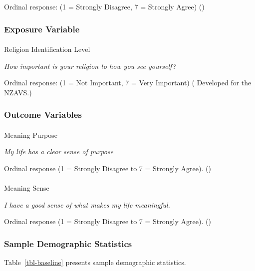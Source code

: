 \documentclass[
  single column]{article}
\makeatletter
\let\oldparagraph\paragraph
\renewcommand{\paragraph}{
    \@ifstar
      \xxxParagraphStar
      \xxxParagraphNoStar
  }
\newcommand{\xxxParagraphStar}[1]{\oldparagraph*{#1}\mbox{}}
\newcommand{\xxxParagraphNoStar}[1]{\oldparagraph{#1}\mbox{}}
\makeatother
\begin{document}
Ordinal response: (1 = Strongly Disagree, 7 = Strongly Agree)
()

\subsubsection{Exposure Variable}\label{exposure-variable}

\paragraph{Religion Identification
Level}\label{religion-identification-level}

\emph{How important is your religion to how you see yourself?}

Ordinal response: (1 = Not Important, 7 = Very Important)
( Developed for the
NZAVS.)

\subsubsection{Outcome Variables}\label{outcome-variables}

\paragraph{Meaning Purpose}\label{meaning-purpose-4}

\emph{My life has a clear sense of purpose}

Ordinal response (1 = Strongly Disagree to 7 = Strongly Agree).
()

\paragraph{Meaning Sense}\label{meaning-sense-4}

\emph{I have a good sense of what makes my life meaningful.}

Ordinal response (1 = Strongly Disagree to 7 = Strongly Agree).
()

\subsubsection{Sample Demographic
Statistics}\label{sample-demographic-statistics}

Table~\ref{tbl-baseline} presents sample demographic statistics.
\end{document}
